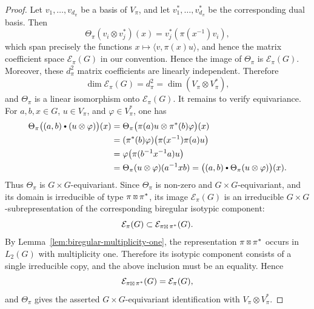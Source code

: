 \documentclass[11pt,showkeys]{amsart}
\newcommand{\sboxtimes}
{\mathbin{\vcenter{\hbox{\scalebox{0.65}{$\boxtimes$}}}}}
\newcommand{\hbullet}{\mathbin{\vcenter{\hbox{\scalebox{0.7}{$\bullet$}}}}}
\begin{document}
\begin{proof}
Let \(v_1,\ldots,v_{d_\pi}\) be a basis of \(V_\pi\), and let
\(v_1^*,\ldots,v_{d_\pi}^*\) be the corresponding dual basis. Then
\[
        \Theta_\pi(v_i\otimes v_j^*)(x)
        =
        v_j^*(\pi(x^{-1})v_i),
\]
which span precisely the functions
\(x\mapsto\langle v,\pi(x)u\rangle\), and hence the matrix coefficient
space \(\mathcal E_\pi(G)\) in our convention. Hence the image
of \(\Theta_\pi\) is \(\mathcal E_\pi(G)\).
Moreover, these \(d_\pi^2\) matrix coefficients are linearly
independent. Therefore
\[
        \dim\mathcal E_\pi(G)
        =
        d_\pi^2
        =
        \dim(V_\pi\otimes V_\pi^*),
\]
and \(\Theta_\pi\) is a linear isomorphism onto
\(\mathcal E_\pi(G)\).
It remains to verify equivariance. For \(a,b,x\in G\),
\(u\in V_\pi\), and \(\varphi\in V_\pi^*\), one has
\[
\begin{aligned}
        \Theta_\pi\bigl((a,b)\hbullet (u\otimes\varphi)\bigr)(x)
        &=
        \Theta_\pi
        \bigl(\pi(a)u\otimes\pi^*(b)\varphi\bigr)(x)
        \\
        &=
        (\pi^*(b)\varphi)\bigl(\pi(x^{-1})\pi(a)u\bigr)
        \\
        &=
        \varphi\bigl(\pi(b^{-1}x^{-1}a)u\bigr)
        \\
        &=
        \Theta_\pi(u\otimes\varphi)(a^{-1}xb)
        =
        \bigl((a,b)\hbullet\Theta_\pi(u\otimes\varphi)\bigr)(x).
\end{aligned}
\]
Thus \(\Theta_\pi\) is \(G\times G\)-equivariant.
Since \(\Theta_\pi\) is non-zero and \(G\times G\)-equivariant, and
its domain is irreducible of type \(\pi\sboxtimes\pi^*\), its image
\(\mathcal E_\pi(G)\) is an irreducible \(G\times G\)-subrepresentation
of the corresponding biregular isotypic component:
\[
        \mathcal E_\pi(G) \subset
        \mathcal E_{\pi\sboxtimes\,\pi^*}(G).
\]
By Lemma~\ref{lem:biregular-multiplicity-one}, the representation
\(\pi\sboxtimes\pi^*\) occurs in \(L_2(G)\) with multiplicity one.
Therefore its isotypic component consists of a single irreducible copy,
and the above inclusion must be an equality. Hence
\[
        \mathcal E_{\pi\sboxtimes\,\pi^*}(G)
        = \mathcal E_\pi(G),
\]
and \(\Theta_\pi\) gives the asserted \(G\times G\)-equivariant
identification with \(V_\pi\otimes V_\pi^*\).
\end{proof}
\end{document}
